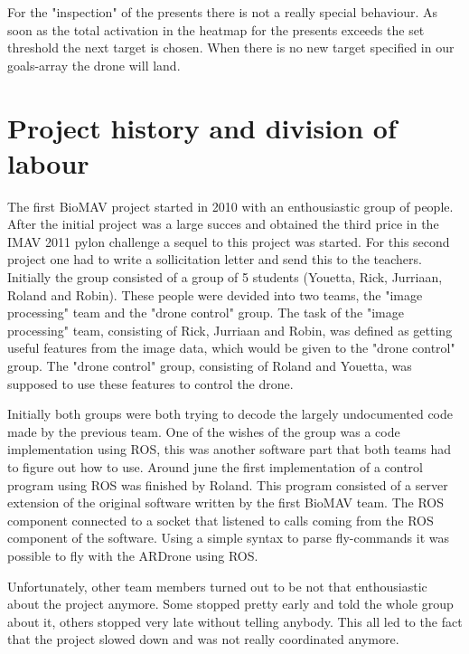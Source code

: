 \documentclass[a4paper,10pt]{article}
\begin{document}
For the "inspection" of the presents there is not a really special behaviour. 
As soon as the total activation in the heatmap for the presents exceeds the set threshold the next target is chosen. 
When there is no new target specified in our goals-array the drone will land. 

\section{Project history and division of labour}
The first BioMAV project started in 2010 with an enthousiastic group of people.
After the initial project was a large succes and obtained the third price in the IMAV 2011 pylon challenge a sequel to this project was started.
For this second project one had to write a sollicitation letter and send this to the teachers. 
Initially the group consisted of a group of 5 students (Youetta, Rick, Jurriaan, Roland and Robin).  
These people were devided into two teams, the "image processing" team and the "drone control" group. 
The task of the "image processing" team, consisting of Rick, Jurriaan and Robin, was defined as getting useful features from the image data, which would be given to the "drone control" group.
The "drone control" group, consisting of Roland and Youetta, was supposed to use these features to control the drone. 

Initially both groups were both trying to decode the largely undocumented code made by the previous team.
One of the wishes of the group was a code implementation using ROS, this was another software part that both teams had to figure out how to use. 
Around june the first implementation of a control program using ROS was finished by Roland. 
This program consisted of a server extension of the original software written by the first BioMAV team.  
The ROS component connected to a socket that listened to calls coming from the ROS component of the software. 
Using a simple syntax to parse fly-commands it was possible to fly with the ARDrone using ROS.  

Unfortunately, other team members turned out to be not that enthousiastic about the project anymore. 
Some stopped pretty early and told the whole group about it, others stopped very late without telling anybody.
This all led to the fact that the project slowed down and was not really coordinated anymore. 
\end{document}
